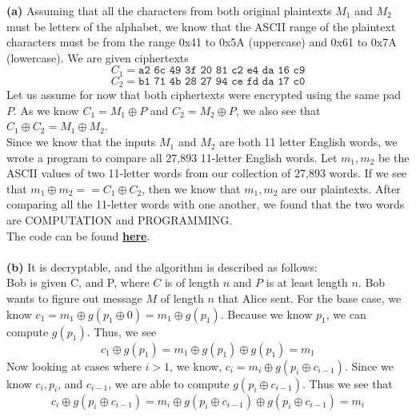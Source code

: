 \documentclass[11pt]{article}
\begin{document}
{\bf (a)} Assuming that all the characters from both original plaintexts $M_1$ and $M_2$ must be letters of the alphabet, we know that the ASCII range of the plaintext characters must be from the range 0x41 to 0x5A (uppercase) and 0x61 to 0x7A (lowercase). We are given ciphertexts 
$$C_1 = \texttt{a2 6c 49 3f 20 81 c2 e4 da 16 c9}$$
$$C_2 = \texttt{b1 71 4b 28 27 94 ce fd da 17 c0}$$
Let us assume for now that both ciphertexts were encrypted using the same pad $P$. As we know $C_1 = M_1 \oplus P$ and $C_2 = M_2 \oplus P$, we also see that $C_1 \oplus C_2 = M_1 \oplus M_2$. 
\\ Since we know that the inputs $M_1$ and $M_2$ are both 11 letter English words, we wrote a program to compare all 27,893 11-letter English words. Let $m_1, m_2$ be the ASCII values of two 11-letter words from our collection of 27,893 words. If we see that $m_1 \oplus m_2 == C_1 \oplus C_2$, then we know that $m_1, m_2$ are our plaintexts. After comparing all the 11-letter words with one another, we found that the two words are COMPUTATION and PROGRAMMING.
\\ The code can be found \textbf{\href{https://github.com/qandrew/6.857/blob/master/Pset\%201/p1-3a.py}{here}}.
\\
\\ \textbf{(b)} It is decryptable, and the algorithm is described as follows:
\\ Bob is given C, and P, where $C$ is of length $n$ and $P$ is at least length $n$. Bob wants to figure out message $M$ of length $n$ that Alice sent. For the base case, we know $c_1 = m_1 \oplus g(p_1 \oplus 0) = m_1 \oplus g(p_1)$. Because we know $p_1$, we can compute $g(p_1)$. Thus, we see 
$$c_1 \oplus g(p_1) = m_1 \oplus g(p_1) \oplus g(p_1) = m_1$$
Now looking at cases where $i > 1$, we know, $c_i = m_i \oplus g(p_i \oplus c_{i-1})$. Since we know $c_i, p_i$, and $c_{i-1}$, we are able to compute $g(p_i \oplus c_{i-1})$. Thus we see that 
$$c_i \oplus g(p_i \oplus c_{i-1}) = m_i \oplus g(p_i \oplus c_{i-1}) \oplus g(p_i \oplus c_{i-1}) = m_i$$
\end{document}
